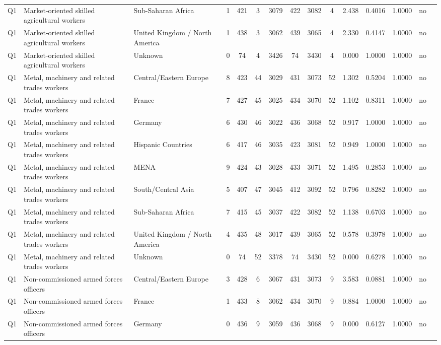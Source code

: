 \begin{longtable}{lllrcccccccccll}
Q1 & Market-oriented skilled agricultural workers & Sub-Saharan Africa & 1 & 421 & 3 & 3079 & 422 & 3082 & 4 & 2.438 & 0.4016 & 1.0000 & no \\
Q1 & Market-oriented skilled agricultural workers & United Kingdom / North America & 1 & 438 & 3 & 3062 & 439 & 3065 & 4 & 2.330 & 0.4147 & 1.0000 & no \\
Q1 & Market-oriented skilled agricultural workers & Unknown & 0 & 74 & 4 & 3426 & 74 & 3430 & 4 & 0.000 & 1.0000 & 1.0000 & no \\
Q1 & Metal, machinery and related trades workers & Central/Eastern Europe & 8 & 423 & 44 & 3029 & 431 & 3073 & 52 & 1.302 & 0.5204 & 1.0000 & no \\
Q1 & Metal, machinery and related trades workers & France & 7 & 427 & 45 & 3025 & 434 & 3070 & 52 & 1.102 & 0.8311 & 1.0000 & no \\
Q1 & Metal, machinery and related trades workers & Germany & 6 & 430 & 46 & 3022 & 436 & 3068 & 52 & 0.917 & 1.0000 & 1.0000 & no \\
Q1 & Metal, machinery and related trades workers & Hispanic Countries & 6 & 417 & 46 & 3035 & 423 & 3081 & 52 & 0.949 & 1.0000 & 1.0000 & no \\
Q1 & Metal, machinery and related trades workers & MENA & 9 & 424 & 43 & 3028 & 433 & 3071 & 52 & 1.495 & 0.2853 & 1.0000 & no \\
Q1 & Metal, machinery and related trades workers & South/Central Asia & 5 & 407 & 47 & 3045 & 412 & 3092 & 52 & 0.796 & 0.8282 & 1.0000 & no \\
Q1 & Metal, machinery and related trades workers & Sub-Saharan Africa & 7 & 415 & 45 & 3037 & 422 & 3082 & 52 & 1.138 & 0.6703 & 1.0000 & no \\
Q1 & Metal, machinery and related trades workers & United Kingdom / North America & 4 & 435 & 48 & 3017 & 439 & 3065 & 52 & 0.578 & 0.3978 & 1.0000 & no \\
Q1 & Metal, machinery and related trades workers & Unknown & 0 & 74 & 52 & 3378 & 74 & 3430 & 52 & 0.000 & 0.6278 & 1.0000 & no \\
Q1 & Non-commissioned armed forces officers & Central/Eastern Europe & 3 & 428 & 6 & 3067 & 431 & 3073 & 9 & 3.583 & 0.0881 & 1.0000 & no \\
Q1 & Non-commissioned armed forces officers & France & 1 & 433 & 8 & 3062 & 434 & 3070 & 9 & 0.884 & 1.0000 & 1.0000 & no \\
Q1 & Non-commissioned armed forces officers & Germany & 0 & 436 & 9 & 3059 & 436 & 3068 & 9 & 0.000 & 0.6127 & 1.0000 & no \\

\end{longtable}
